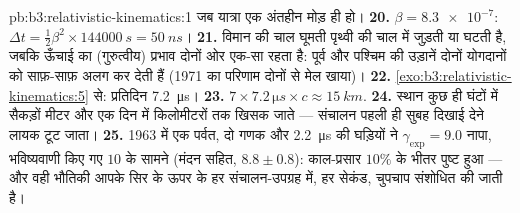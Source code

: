 \begin{solution}{pb:b3:relativistic-kinematics:1}
जब यात्रा एक अंतहीन मोड़ ही हो।
\textbf{20.} $\beta = \num{8.3e-7}$: $\Delta t = \tfrac12\beta^2
\times \qty{144000}{s} = \qty{50}{ns}$।
\textbf{21.} विमान की चाल घूमती पृथ्वी की चाल में जुड़ती या घटती है,
जबकि ऊँचाई का (गुरुत्वीय) प्रभाव दोनों ओर एक-सा रहता है: पूर्व और
पश्चिम की उड़ानें दोनों योगदानों को साफ़-साफ़ अलग कर देती हैं (1971 का
परिणाम दोनों से मेल खाया)।
\textbf{22.} \cref{exo:b3:relativistic-kinematics:5} से:
प्रतिदिन \qty{7.2}{\micro s}।
\textbf{23.} $7 \times 7.2\,\unit{\micro s} \times c \approx
\qty{15}{km}.$
\textbf{24.} स्थान कुछ ही घंटों में सैकड़ों मीटर और एक दिन में
किलोमीटरों तक खिसक जाते --- संचालन पहली ही सुबह दिखाई देने लायक
टूट जाता।
\textbf{25.} 1963 में एक पर्वत, दो गणक और \qty{2.2}{\micro s} की
घड़ियों ने $\gamma_{\exp} = 9.0$ नापा, भविष्यवाणी किए गए $10$ के सामने
(मंदन सहित, $8.8 \pm 0.8$): काल-प्रसार $10\%$ के भीतर पुष्ट हुआ ---
और वही भौतिकी आपके सिर के ऊपर के हर संचालन-उपग्रह में, हर सेकंड, चुपचाप
संशोधित की जाती है।
\end{solution}
